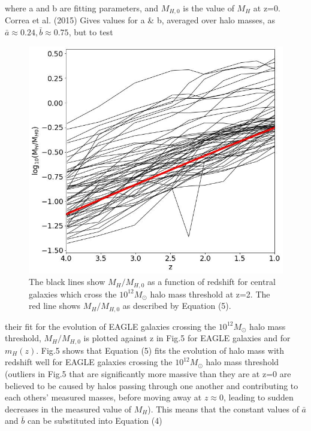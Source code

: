 \documentclass[12pt, twocolumn]{revtex4}    %
\begin{document}
\noindent where a and b are fitting parameters, and $M_{H,0}$ is the value of $M_H$ at z=0. Correa et al. (2015) Gives values for a \& b, averaged over halo masses, as $\bar a \approx 0.24, \bar b \approx 0.75$, but to test

\onecolumngrid


\begin{figure}[H]
\centering
\includegraphics[width=\linewidth]{Plot_5.jpeg}
\caption{The black lines show $M_H/M_{H,0}$ as a function of redshift for central galaxies which cross the $10^{12}M_\odot$ halo mass threshold at z=2. The red line shows $M_H/M_{H,0}$ as described by Equation (5).}
\label{fig:5}
\end{figure}
\twocolumngrid


\noindent their fit for the evolution of EAGLE galaxies crossing the $10^{12}M_\odot$ halo mass threshold, $M_H/M_{H,0}$ is plotted against z in Fig.5 for EAGLE galaxies and for $m_H(z)$. Fig.5 shows that Equation (5) fits the evolution of halo mass with redshift well for EAGLE galaxies crossing the $10^{12}M_\odot$ halo mass threshold (outliers in Fig.5 that are significantly more massive than they are at z=0 are believed to be caused by halos passing through one another and contributing to each others' measured masses, before moving away at $z\approx0$, leading to  sudden decreases in the measured value of $M_H$). This means that the constant values of $\bar a$ and $\bar b$ can be substituted into Equation (4)
\end{document}
